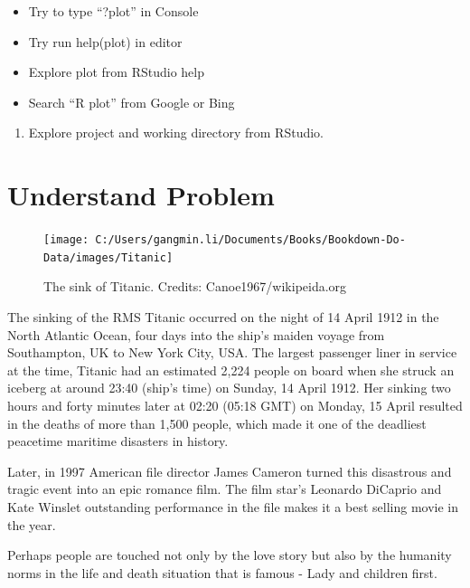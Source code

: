 \documentclass[
]{book}
\providecommand{\tightlist}{%
  \setlength{\itemsep}{0pt}\setlength{\parskip}{0pt}}
\renewenvironment{quote}{\begin{VF}}{\end{VF}}
\begin{document}
\begin{itemize}
\tightlist
\item
  Try to type ``?plot'' in Console
\item
  Try run help(plot) in editor
\item
  Explore plot from RStudio help
\item
  Search ``R plot'' from Google or Bing
\end{itemize}

\begin{enumerate}
\def\labelenumi{\arabic{enumi}.}
\setcounter{enumi}{3}
\tightlist
\item
  Explore project and working directory from RStudio.
\end{enumerate}

\hypertarget{prob}{%
\chapter{Understand Problem}\label{prob}}

\begin{figure}

{\centering \texttt{[image: C:/Users/gangmin.li/Documents/Books/Bookdown-Do-Data/images/Titanic]} 

}

\caption{The sink of Titanic. Credits: Canoe1967/wikipeida.org}\label{fig:unnamed-chunk-9}
\end{figure}

\begin{quote}
\end{quote}

The sinking of the RMS Titanic occurred on the night of 14 April 1912 in the North Atlantic Ocean, four days into the ship's maiden voyage from Southampton, UK to New York City, USA. The largest passenger liner in service at the time, Titanic had an estimated 2,224 people on board when she struck an iceberg at around 23:40 (ship's time) on Sunday, 14 April 1912. Her sinking two hours and forty minutes later at 02:20 (05:18 GMT) on Monday, 15 April resulted in the deaths of more than 1,500 people, which made it one of the deadliest peacetime maritime disasters in history.

Later, in 1997 American file director James Cameron turned this disastrous and tragic event into an epic romance film. The film star's Leonardo DiCaprio and Kate Winslet outstanding performance in the file makes it a best selling movie in the year.

Perhaps people are touched not only by the love story but also by the humanity norms in the life and death situation that is famous - Lady and children first.
\end{document}

